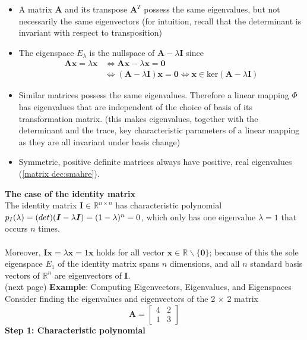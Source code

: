 \documentclass{report}
\begin{document}
\begin{itemize}
\item A matrix $\bm{A}$ and its transpose $\bm{A}^T$ possess the same eigenvalues, but not necessarily the
same eigenvectors (for intuition, recall that the determinant is invariant with respect to transposition)
\item The eigenspace $E_\lambda$ is the nullspace of 
$\bm{A}-\lambda\bm{I}$ since
\begin{align*}
\bm{Ax}=\lambda\bm{x}&\iff\bm{Ax}-\lambda\bm{x}=\bm{0}\\
&\iff(\bm{A}-\lambda\bm{I})\bm{x}=\bm{0}\iff\bm{x}
\in\text{ker}(\bm{A}-\lambda\bm{I})
\end{align*}
\item Similar matrices possess the same eigenvalues. Therefore a linear mapping $\Phi$ has eigenvalues that are
independent of the choice of basis of its transformation matrix. 
(this makes eigenvalues, together with the determinant and the trace, key characteristic parameters of a linear
mapping as they are all invariant under basis change)
\item Symmetric, positive definite matrices always have positive, real eigenvalues (\ref{matrix dec:smahre}).
\end{itemize}
\textbf{The case of the identity matrix}\\
The identity matrix $\bm{I}\in\mathbb{R}^{n\times n}$ has characteristic polynomial $p_I(\lambda)=\text(det)
(\bm{I}-\lambda\bm{I})=(1-\lambda)^n=0$, which only has one eigenvalue $\lambda=1$ that occurs $n$ times.\\
\vspace{1mm}\\
Moreover, $\bm{Ix}=\lambda\bm{x}=1\bm{x}$ holds for all vector
$\bm{x}\in\mathbb{R}\backslash\{\bm{0}\}$; because of this the sole eigenspace $E_1$ of the identity matrix
spans $n$ dimensions, and all $n$ standard basis vectors
of $\mathbb{R}^n$ are eigenvectors of $\bm{I}$.\\
(next page)
\newpage
\noindent\textbf{Example}: Computing Eigenvectors, Eigenvalues, and Eigenspaces\\
Consider finding the eigenvalues and eigenvectors of the 2 $\times$ 2 matrix
\begin{equation*}
\bm{A}=\begin{bmatrix}
4&2\\1&3\end{bmatrix}
\end{equation*}
\textbf{Step 1: Characteristic polynomial}\\
\end{document}
